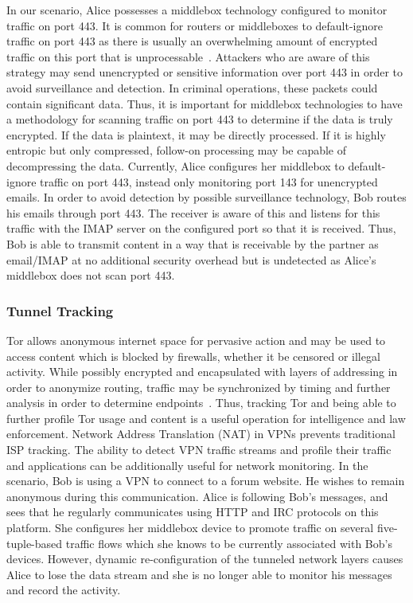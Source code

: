 In our scenario, Alice possesses a middlebox technology configured to monitor traffic on port 443. It is common for routers or middleboxes to default-ignore traffic on port 443 as there is usually an overwhelming amount of encrypted traffic on this port that is unprocessable~\cite{shane-review-dns-over-http-04}. Attackers who are aware of this strategy may send unencrypted or sensitive information over port 443 in order to avoid surveillance and detection. In criminal operations, these packets could contain significant data. Thus, it is important for middlebox technologies to have a methodology for scanning traffic on port 443 to determine if the data is truly encrypted. If the data is plaintext, it may be directly processed. If it is highly entropic but only compressed, follow-on processing may be capable of decompressing the data. Currently, Alice configures her middlebox to default-ignore traffic on port 443, instead only monitoring port 143 for unencrypted emails. In order to avoid detection by possible surveillance technology, Bob routes his emails through port 443. The receiver is aware of this and listens for this traffic with the IMAP server on the configured port so that it is received. Thus, Bob is able to transmit content in a way that is receivable by the partner as email/IMAP at no additional security overhead but is undetected as Alice's middlebox does not scan port 443.

\subsubsection{Tunnel Tracking}
Tor allows anonymous internet space for pervasive action and may be used to access content which is blocked by firewalls, whether it be censored or illegal activity. While possibly encrypted and encapsulated with layers of addressing in order to anonymize routing, traffic may be synchronized by timing and further analysis in order to determine endpoints~\cite{Simioni2021}. Thus, tracking Tor and being able to further profile Tor usage and content is a useful operation for intelligence and law enforcement. Network Address Translation (NAT) in VPNs prevents traditional ISP tracking. The ability to detect VPN traffic streams and profile their traffic and applications can be additionally useful for network monitoring. In the scenario, Bob is using a VPN to connect to a forum website. He wishes to remain anonymous during this communication. Alice is following Bob's messages, and sees that he regularly communicates using HTTP and IRC protocols on this platform. She configures her middlebox device to promote traffic on several five-tuple-based traffic flows which she knows to be currently associated with Bob's devices. However, dynamic re-configuration of the tunneled network layers causes Alice to lose the data stream and she is no longer able to monitor his messages and record the activity.


